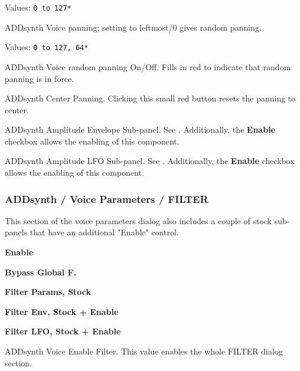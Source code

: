    Values: \texttt{0 to 127*}

   ADDsynth Voice panning; setting to leftmost/0 gives random panning.

   Values: \texttt{0 to 127, 64*}

   ADDsynth Voice random panning On/Off.
   Fills in red to indicate that random panning is in force.

   ADDsynth Center Panning.
   Clicking this small red button resets the panning to center.

   ADDsynth Amplitude Envelope Sub-panel.
   See .
   Additionally, the \textbf{Enable} checkbox allows the enabling of this
   component.

   ADDsynth Amplitude LFO Sub-panel.
   See .
   Additionally, the \textbf{Enable} checkbox allows the enabling of this
   component.

\subsubsection{ADDsynth / Voice Parameters / FILTER}
\label{subsubsec:addsynth_voice_parameters_filter}

   This section of the voice parameters dialog also includes a couple of
   stock sub-panels that have an additional "Enable" control.

   \begin{enumber}
      \item \textbf{Enable}
      \item \textbf{Bypass Global F.}
      \item \textbf{Filter Params, Stock}
      \item \textbf{Filter Env, Stock + Enable}
      \item \textbf{Filter LFO, Stock + Enable}
   \end{enumber}

   \setcounter{ItemCounter}{0}      %

   ADDsynth Voice Enable Filter.
   This value enables the whole FILTER dialog section.

